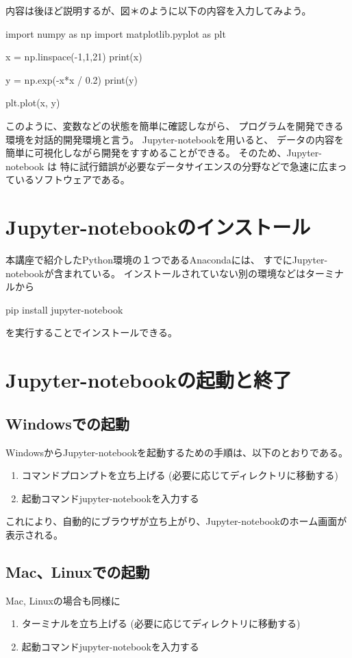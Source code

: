 内容は後ほど説明するが、図＊のように以下の内容を入力してみよう。

\noindent
{\ttfamily
import numpy as np
import matplotlib.pyplot as plt
}

\noindent
{\ttfamily
x = np.linspace(-1,1,21)
print(x)
}

\noindent
{\ttfamily
y = np.exp(-x*x / 0.2)
print(y)
}

\noindent
{\ttfamily
plt.plot(x, y)
}

%
このように、変数などの状態を簡単に確認しながら、
プログラムを開発できる環境を対話的開発環境と言う。
Jupyter-notebookを用いると、
データの内容を簡単に可視化しながら開発をすすめることができる。
そのため、Jupyter-notebook は
特に試行錯誤が必要なデータサイエンスの分野などで急速に広まっているソフトウェアである。

\section{Jupyter-notebookのインストール}
本講座で紹介したPython環境の１つであるAnacondaには、
すでにJupyter-notebookが含まれている。
%
インストールされていない別の環境などはターミナルから

\noindent
{\ttfamily
pip install jupyter-notebook
}

を実行することでインストールできる。


\section{Jupyter-notebookの起動と終了}
\subsection{Windowsでの起動}
WindowsからJupyter-notebookを起動するための手順は、以下のとおりである。
\begin{enumerate}
  \item コマンドプロンプトを立ち上げる
  (必要に応じてディレクトリに移動する)
  \item 起動コマンド{\ttfamily jupyter-notebook}を入力する
\end{enumerate}
これにより、自動的にブラウザが立ち上がり、Jupyter-notebookのホーム画面が表示される。


\subsection{Mac、Linuxでの起動}
Mac, Linuxの場合も同様に
\begin{enumerate}
  \item ターミナルを立ち上げる
  (必要に応じてディレクトリに移動する)
  \item 起動コマンド{\ttfamily jupyter-notebook}を入力する
\end{enumerate}

